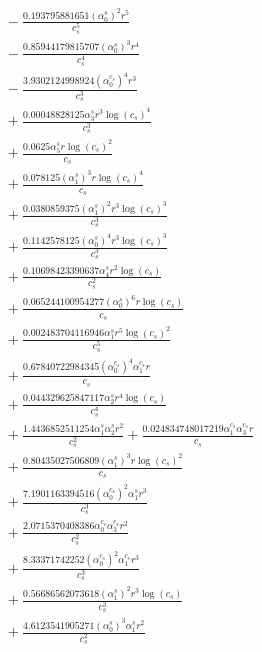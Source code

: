 \documentclass[10pt]{article}
\begin{document}
\begin{align*}
&{}  - \frac{0.193795881651 \left(\alpha_{0}^s\right)^{2} r^{5}}{c_{s}^{5}} \\
&{}  - \frac{0.85944179815707 \left(\alpha_{0}^s\right)^{3} r^{4}}{c_{s}^{4}} \\
&{}  - \frac{3.9302124998924 \left(\alpha_{0}^{c_s}\right)^{4} r^{3}}{c_{s}^{3}} \\
&{}  + \frac{0.00048828125 \alpha_{3}^s r^{3} \log{\left(c_{s} \right)}^{4}}{c_{s}^{3}} \\
&{}  + \frac{0.0625 \alpha_{5}^s r \log{\left(c_{s} \right)}^{2}}{c_{s}} \\
&{}  + \frac{0.078125 \left(\alpha_{1}^s\right)^{3} r \log{\left(c_{s} \right)}^{4}}{c_{s}} \\
&{}  + \frac{0.0380859375 \left(\alpha_{1}^s\right)^{2} r^{3} \log{\left(c_{s} \right)}^{3}}{c_{s}^{3}} \\
&{}  + \frac{0.1142578125 \left(\alpha_{0}^s\right)^{4} r^{3} \log{\left(c_{s} \right)}^{3}}{c_{s}^{3}} \\
&{}  + \frac{0.10698423390637 \alpha_{4}^s r^{2} \log{\left(c_{s} \right)}}{c_{s}^{2}} \\
&{}  + \frac{0.065244100954277 \left(\alpha_{0}^s\right)^{6} r \log{\left(c_{s} \right)}}{c_{s}} \\
&{}  + \frac{0.002483704116946 \alpha_{1}^s r^{5} \log{\left(c_{s} \right)}^{2}}{c_{s}^{5}} \\
&{}  + \frac{0.67840722984345 \left(\alpha_{0}^{c_s}\right)^{4} \alpha_{1}^{c_s} r}{c_{s}} \\
&{}  + \frac{0.044329625847117 \alpha_{2}^s r^{4} \log{\left(c_{s} \right)}}{c_{s}^{4}} \\
&{}  + \frac{1.4436852511254 \alpha_{1}^s \alpha_{2}^s r^{2}}{c_{s}^{2}} + \frac{0.024834748017219 \alpha_{1}^{c_s} \alpha_{3}^{c_s} r}{c_{s}} \\
&{}  + \frac{0.80435027506809 \left(\alpha_{1}^s\right)^{3} r \log{\left(c_{s} \right)}^{2}}{c_{s}} \\
&{}  + \frac{7.1901163394516 \left(\alpha_{0}^{c_s}\right)^{2} \alpha_{1}^s r^{3}}{c_{s}^{3}} \\
&{}  + \frac{2.0715370408386 \alpha_{0}^{c_s} \alpha_{3}^{c_s} r^{2}}{c_{s}^{2}} \\
&{}  + \frac{8.33371742252 \left(\alpha_{0}^{c_s}\right)^{2} \alpha_{1}^{c_s} r^{3}}{c_{s}^{3}} \\
&{}  + \frac{0.56686562073618 \left(\alpha_{1}^s\right)^{2} r^{3} \log{\left(c_{s} \right)}}{c_{s}^{3}} \\
&{}  + \frac{4.6123541905271 \left(\alpha_{0}^s\right)^{3} \alpha_{1}^s r^{2}}{c_{s}^{2}} \\

\end{align*}
\end{document}

